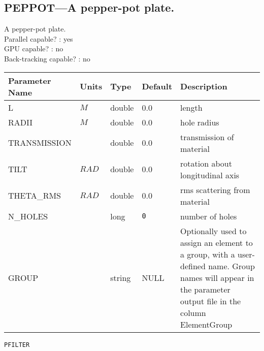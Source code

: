 \subsection{PEPPOT---A pepper-pot plate.}
A pepper-pot plate.
\\
Parallel capable? : yes\\
GPU capable? : no\\
Back-tracking capable? : no\\
\begin{tabular}{|l|l|l|l|p{\descwidth}|} \hline
Parameter Name & Units & Type & Default & Description \\ \hline 
L & $M$ & double &  0.0 & length  \\ \hline 
RADII & $M$ & double &  0.0 & hole radius  \\ \hline 
TRANSMISSION &  & double &  0.0 & transmission of material  \\ \hline 
TILT & $RAD$ & double &  0.0 & rotation about longitudinal axis  \\ \hline 
THETA\_RMS & $RAD$ & double &  0.0 & rms scattering from material  \\ \hline 
N\_HOLES &  & long &  \verb|0| & number of holes  \\ \hline 
GROUP &  & string & NULL & Optionally used to assign an element to a group, with a user-defined name.  Group names will appear in the parameter output file in the column ElementGroup  \\ \hline 
\end{tabular}

\newpage
\begin{center}{\Large\verb|PFILTER|}\end{center}

